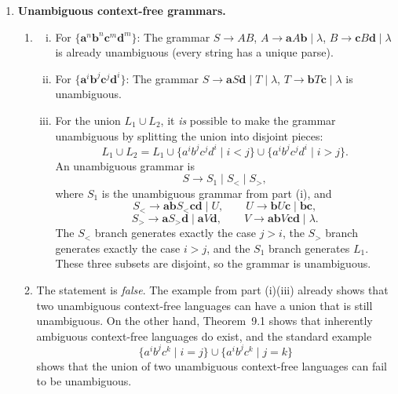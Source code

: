 \begin{enumerate}[{9.}1. ]
\begin{enumerate}
\item $\{\pmb{a}^n\pmb{b}^n\pmb{c}^m\pmb{d}^m\} \cup \{\pmb{a}^i\pmb{b}^j\pmb{c}^j\pmb{d}^i\}$:
\[
S \to S_1 \mid S_2
\]
where $S_1$ generates the first language (as in part (a)) and $S_2$
generates the second (as in part (b)). The two productions from $S$ are the
grammar-level union construction.
\end{enumerate}

\item \textbf{Unambiguous context-free grammars.}

\begin{enumerate}
\item
\begin{enumerate}[i.]
\item For $\{\pmb{a}^n\pmb{b}^n\pmb{c}^m\pmb{d}^m\}$: The grammar $S \to AB$, $A \to \pmb{a}A\pmb{b}\mid\lambda$, $B \to \pmb{c}B\pmb{d}\mid\lambda$ is already unambiguous (every string has a unique parse).

\item For $\{\pmb{a}^i\pmb{b}^j\pmb{c}^j\pmb{d}^i\}$: The grammar $S \to \pmb{a}S\pmb{d}\mid T\mid\lambda$, $T \to \pmb{b}T\pmb{c}\mid\lambda$ is unambiguous.

\item For the union $L_1\cup L_2$, it \emph{is} possible to make the grammar
unambiguous by splitting the union into disjoint pieces:
\[
L_1\cup L_2=L_1\cup\{a^i b^j c^j d^i\mid i<j\}\cup\{a^i b^j c^j d^i\mid i>j\}.
\]
An unambiguous grammar is
\[
S\to S_1\mid S_<\mid S_>,
\]
where $S_1$ is the unambiguous grammar from part (i), and
\[
S_<\to \pmb{a}\pmb{b}S_<\pmb{c}\pmb{d}\mid U,\qquad
U\to \pmb{b}U\pmb{c}\mid \pmb{b}\pmb{c},
\]
\[
S_>\to \pmb{a}S_>\pmb{d}\mid \pmb{a}V\pmb{d},\qquad
V\to \pmb{a}\pmb{b}V\pmb{c}\pmb{d}\mid \lambda.
\]
The $S_<$ branch generates exactly the case $j>i$, the $S_>$ branch generates
exactly the case $i>j$, and the $S_1$ branch generates $L_1$.  These three
subsets are disjoint, so the grammar is unambiguous.
\end{enumerate}

\item The statement is \emph{false}.  The example from part (i)(iii) already
shows that two unambiguous context-free languages can have a union that is
still unambiguous.  On the other hand, Theorem~9.1 shows that inherently
ambiguous context-free languages do exist, and the standard example
\[
\{a^i b^j c^k\mid i=j\}\cup\{a^i b^j c^k\mid j=k\}
\]
shows that the union of two unambiguous context-free languages can fail to be
unambiguous.


\end{enumerate}
\end{enumerate}
